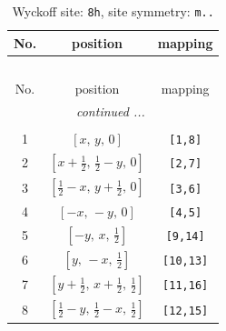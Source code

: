 \documentclass[fleqn,8pt]{jsarticle}
\begin{document}
\begin{longtable}{ccc}
\caption{Wyckoff site: {\tt 8h}, site symmetry: {\tt m..}}
 \\
 \hline \hline
No. & position & mapping \\ \hline \endfirsthead

\multicolumn{2}{l}{\tablename\ \thetable{}} \\
 \hline \hline
No. & position & mapping \\ \hline \endhead

 \hline \hline
\multicolumn{2}{r}{\footnotesize\it continued ...} \\ \endfoot

 \hline \hline
\multicolumn{2}{r}{} \\ \endlastfoot

1 & $\left[ x,\, y,\, 0 \right]$ & {\tt [1,8]} \\ \hline
2 & $\left[ x + \frac{1}{2},\, \frac{1}{2} - y,\, 0 \right]$ & {\tt [2,7]} \\ \hline
3 & $\left[ \frac{1}{2} - x,\, y + \frac{1}{2},\, 0 \right]$ & {\tt [3,6]} \\ \hline
4 & $\left[ - x,\, - y,\, 0 \right]$ & {\tt [4,5]} \\ \hline
5 & $\left[ - y,\, x,\, \frac{1}{2} \right]$ & {\tt [9,14]} \\ \hline
6 & $\left[ y,\, - x,\, \frac{1}{2} \right]$ & {\tt [10,13]} \\ \hline
7 & $\left[ y + \frac{1}{2},\, x + \frac{1}{2},\, \frac{1}{2} \right]$ & {\tt [11,16]} \\ \hline
8 & $\left[ \frac{1}{2} - y,\, \frac{1}{2} - x,\, \frac{1}{2} \right]$ & {\tt [12,15]} \\
\end{longtable}
\renewcommand{\arraystretch}{1.2}
\end{document}
